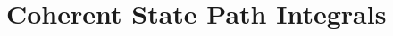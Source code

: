 \documentclass[../classnotes.tex]{subfiles}
\begin{document}
\chapter{Coherent State Path Integrals}
\end{document}
